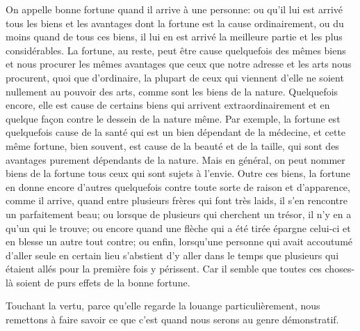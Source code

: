 On appelle bonne fortune quand il arrive à une personne: ou qu'il lui est arrivé tous les biens et les avantages dont la
fortune est la cause ordinairement, ou du moins quand de tous ces biens, il lui en est arrivé la meilleure partie et les
plus considérables. La fortune, au reste, peut être cause quelquefois des mêmes biens et nous procurer les mêmes avantages
que ceux que notre adresse et les arts nous procurent, quoi que d'ordinaire, la plupart de ceux qui viennent d'elle ne
soient nullement au pouvoir des arts, comme sont les biens de la nature. Quelquefois encore, elle est cause de certains
biens qui arrivent extraordinairement et en quelque façon contre le dessein de la nature même. Par exemple, la fortune est
quelquefois cause de la santé qui est un bien dépendant de la médecine, et cette même fortune, bien souvent, est cause de
la beauté et de la taille, qui sont des avantages purement dépendants de la nature. Mais en général, on peut nommer biens
de la fortune tous ceux qui sont sujets à l'envie. Outre ces biens, la fortune en donne encore d'autres quelquefois contre
toute sorte de raison et d'apparence, comme il arrive, quand entre plusieurs frères qui font très laids, il s'en rencontre
un parfaitement beau; ou lorsque de plusieurs qui cherchent un trésor, il n'y en a qu'un qui le trouve; ou encore quand
une flèche qui a été tirée épargne celui-ci et en blesse un autre tout contre; ou enfin, lorsqu'une personne qui avait
accoutumé d'aller seule en certain lieu s'abstient d'y aller dans le temps que plusieurs qui étaient allés pour la première
fois y périssent. Car il semble que toutes ces choses-là soient de purs effets de la bonne fortune.

\bigbreak

Touchant la vertu, parce qu'elle regarde la louange particulièrement, nous remettons à faire savoir ce que c'est quand nous serons au genre démonstratif.
